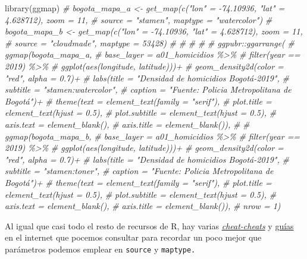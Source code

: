 \documentclass[
]{book}
\newenvironment{Shaded}{\begin{snugshade}}{\end{snugshade}}
\newcommand{\CommentTok}[1]{\textcolor[rgb]{0.56,0.35,0.01}{\textit{#1}}}
\newcommand{\FunctionTok}[1]{\textcolor[rgb]{0.00,0.00,0.00}{#1}}
\newcommand{\NormalTok}[1]{#1}
\begin{document}
\begin{Shaded}
\begin{Highlighting}[]
\FunctionTok{library}\NormalTok{(ggmap)}
\CommentTok{\# bogota\_mapa\_a \textless{}{-} get\_map(c("lon" = {-}74.10936, "lat" = 4.628712), zoom = 11,}
\CommentTok{\#                        source = "stamen", maptype = "watercolor")}
\CommentTok{\# bogota\_mapa\_b \textless{}{-} get\_map(c("lon" = {-}74.10936, "lat" = 4.628712), zoom = 11,}
\CommentTok{\#                        source = "cloudmade", maptype = 53428)}
\CommentTok{\# }
\CommentTok{\# }
\CommentTok{\# }
\CommentTok{\# }
\CommentTok{\# ggpubr::ggarrange(}
\CommentTok{\#   ggmap(bogota\_mapa\_a,}
\CommentTok{\#         base\_layer = a01\_homicidios \%\textgreater{}\%}
\CommentTok{\#           filter(year == 2019) \%\textgreater{}\%}
\CommentTok{\#           ggplot(aes(longitude, latitude)))+}
\CommentTok{\#     geom\_density2d(color = "red", alpha = 0.7)+}
\CommentTok{\#     labs(title = "Densidad de homicidios Bogotá{-}2019",}
\CommentTok{\#          subtitle = "stamen:watercolor",}
\CommentTok{\#          caption = "Fuente: Policia Metropolitana de Bogotá")+}
\CommentTok{\#     theme(text = element\_text(family = "serif"),}
\CommentTok{\#           plot.title = element\_text(hjust = 0.5),}
\CommentTok{\#           plot.subtitle = element\_text(hjust = 0.5),}
\CommentTok{\#           axis.text = element\_blank(),}
\CommentTok{\#           axis.title = element\_blank()),}
\CommentTok{\# }
\CommentTok{\# ggmap(bogota\_mapa\_b,}
\CommentTok{\#       base\_layer = a01\_homicidios \%\textgreater{}\%}
\CommentTok{\#         filter(year == 2019) \%\textgreater{}\%}
\CommentTok{\#         ggplot(aes(longitude, latitude)))+}
\CommentTok{\#   geom\_density2d(color = "red", alpha = 0.7)+}
\CommentTok{\#   labs(title = "Densidad de homicidios Bogotá{-}2019",}
\CommentTok{\#        subtitle = "stamen:toner",}
\CommentTok{\#        caption = "Fuente: Policia Metropolitana de Bogotá")+}
\CommentTok{\#   theme(text = element\_text(family = "serif"),}
\CommentTok{\#         plot.title = element\_text(hjust = 0.5),}
\CommentTok{\#         plot.subtitle = element\_text(hjust = 0.5),}
\CommentTok{\#         axis.text = element\_blank(),}
\CommentTok{\#         axis.title = element\_blank()),}
\CommentTok{\# nrow = 1)}
\end{Highlighting}
\end{Shaded}

Al igual que casi todo el resto de recursos de R, hay varias \href{https://www.nceas.ucsb.edu/sites/default/files/2020-04/ggmapCheatsheet.pdf}{\emph{cheat-cheats}} y \href{https://journal.r-project.org/archive/2013-1/kahle-wickham.pdf}{guías} en el internet que pocemos consultar para recordar un poco mejor que parámetros podemos emplear en \texttt{source} y \texttt{maptype.}

  
\end{document}
